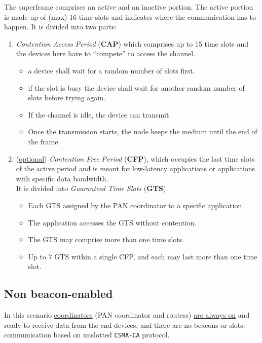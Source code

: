 \begin{itemize}
The superframe comprises an active and an inactive portion. The active portion is made up of (max) 16 time slots and indicates where the communication has to happen.
It is divided into two parts:
\begin{enumerate}
   \item \textit{Contention Access Period} (\textbf{CAP})
   which comprises up to 15 time slots and the devices here have to ``compete'' to access the channel.
   \begin{itemize}
      \item a device shall wait for a random number of slots first.
      \item if the slot is busy the device shall wait for another random number of slots before
      trying again.
      \item If the channel is idle, the device can transmit
      \item Once the transmission starts, the node keeps the medium until the end of the frame
   \end{itemize}
   \item (\ul{optional}) \textit{Contention Free Period} (\textbf{CFP}), which occupies the last time slots of the active period and is meant for low-latency applications or applications with specific data bandwidth.\\
   It is divided into \textit{Guaranteed Time Slots} (\textbf{GTS})
   \begin{itemize}
      \item Each GTS assigned by the PAN coordinator to a specific application.
      \item The application accesses the GTS without contention.
      \item The GTS may comprise more than one time slots.
      \item Up to 7 GTS within a single CFP, and each may last more than one time slot.
   \end{itemize}
\end{enumerate}

\subsection{Non beacon-enabled}
In this scenario \ul{coordinators} (PAN coordinator and routers) \ul{are always on} and ready to receive data from the end-devices, and there are no beacons or slots: communication based on unslotted \texttt{CSMA-CA} protocol.


\end{itemize}
